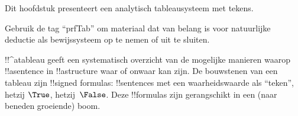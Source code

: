 \documentclass[openany]{memoir}
\begin{document}
\begingroup
\def\olfilename{OLP-0098}
\def\olfilepath{content/first-order-logic/tableaux/}
\hypertarget{unit-OLP-0098}{}



      {}
      {}

\begin{editorial}
Dit hoofdstuk presenteert een analytisch tableausysteem met tekens.
  
Gebruik de tag ``prfTab'' om materiaal dat van belang is voor
natuurlijke deductie als bewijssysteem op te nemen of uit te sluiten.
\end{editorial}












\endgroup

\begingroup
\def\olfilename{OLP-0099}
\def\olfilepath{content/first-order-logic/tableaux/}
\hypertarget{unit-OLP-0099}{}



      {}
      {}


!!^a{tableau} geeft een systematisch overzicht van de mogelijke
manieren waarop !!a{sentence} in !!a{structure} waar of onwaar kan
zijn. De bouwstenen van een tableau zijn !!{signed formula}s:
!!{sentence}s met een waarheidswaarde als ``teken'', hetzij $\True$,
hetzij~$\False$. Deze !!{formula}s zijn gerangschikt in een (naar
beneden groeiende) boom.
\end{document}
